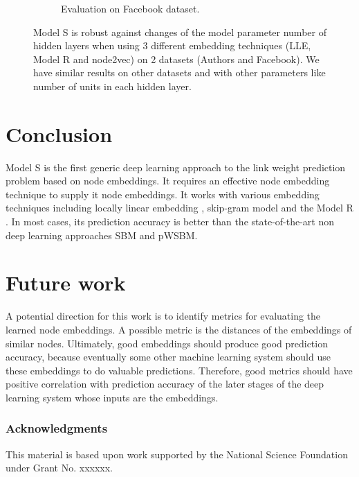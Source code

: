 \documentclass{article} %
\begin{document}
\begin{figure}[h]
\begin{subfigure}{0.49 \linewidth}
		\caption{Evaluation on Facebook dataset.}
		\label{fig:movieLens1M}
	\end{subfigure}
	\caption{
		Model S is robust against changes of the model parameter number of hidden layers when using 3 different embedding techniques (LLE, Model R and node2vec) on 2 datasets (Authors and Facebook).
		We have similar results on other datasets and with other parameters like number of units in each hidden layer.
	}
	\label{fig:robust}
\end{figure}

\section{Conclusion}
Model S is the first generic deep learning approach to the link weight prediction problem based on node embeddings.
It requires an effective node embedding technique to supply it node embeddings.
It works with various embedding techniques including locally linear embedding \citep{roweis2000nonlinear}, skip-gram model \citep{grover2016node2vec} and the Model R \citep{hou2017deep}.
In most cases, its prediction accuracy is better than the state-of-the-art non deep learning approaches SBM and pWSBM.

\section{Future work}
A potential direction for this work is to identify metrics for evaluating the learned node embeddings.
A possible metric is the distances of the embeddings of similar nodes.
Ultimately, good embeddings should produce good prediction accuracy,
because eventually some other machine learning system should use these embeddings to do valuable predictions.
Therefore, good metrics should have positive correlation with prediction accuracy of the later stages of the deep learning system whose inputs are the embeddings.

\subsubsection*{Acknowledgments}
This material is based upon work supported by the National Science Foundation under Grant No. xxxxxx.



\end{document}
